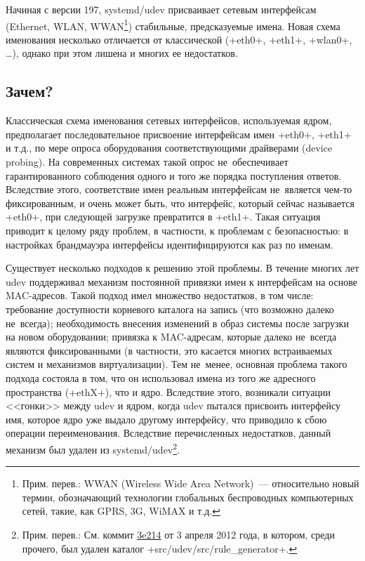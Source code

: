 \documentclass[10pt,oneside,a4paper]{article}
\begin{document}
Начиная с версии 197, systemd/udev присваивает сетевым интерфейсам (Ethernet,
WLAN, WWAN\footnote{Прим. перев.: WWAN (Wireless Wide Area Network)~---
относительно новый термин, обозначающий технологии глобальных беспроводных
компьютерных сетей, такие, как GPRS, 3G, WiMAX и т.д.}) стабильные,
предсказуемые имена. Новая схема именования несколько отличается от классической
(+eth0+, +eth1+, +wlan0+, \ldots{}), однако при этом лишена и многих ее
недостатков.

\subsection{Зачем?}

Классическая схема именования сетевых интерфейсов, используемая ядром,
предполагает последовательное присвоение интерфейсам имен +eth0+, +eth1+ и т.д.,
по мере опроса оборудования соответствующими драйверами (device probing). На
современных системах такой опрос не~обеспечивает гарантированного соблюдения
одного и того же порядка поступления ответов. Вследствие этого, соответствие
имен реальным интерфейсам не~является чем-то фиксированным, и очень может быть,
что интерфейс, который сейчас называется +eth0+, при следующей загрузке
превратится в +eth1+. Такая ситуация приводит к целому ряду проблем, в
частности, к проблемам с безопасностью: в настройках брандмауэра интерфейсы
идентифицируются как раз по именам.

Существует несколько подходов к решению этой проблемы. В течение многих лет udev
поддерживал механизм постоянной привязки имен к интерфейсам на основе
MAC-адресов. Такой подход имел множество недостатков, в том числе: требование
доступности корневого каталога на запись (что возможно далеко не~всегда);
необходимость внесения изменений в образ системы после загрузки на новом
оборудовании; привязка к MAC-адресам, которые далеко не~всегда являются
фиксированными (в частности, это касается многих встраиваемых систем и
механизмов виртуализации). Тем не~менее, основная проблема такого подхода
состояла в том, что он использовал имена из того же адресного пространства
(+ethX+), что и ядро. Вследствие этого, возникали ситуации <<гонки>> между udev
и ядром, когда udev пытался присвоить интерфейсу имя, которое ядро уже выдало
другому интерфейсу, что приводило к сбою операции переименования. Вследствие
перечисленных недостатков, данный механизм был удален из 
systemd/udev\footnote{Прим. перев.: См. коммит
\href{http://cgit.freedesktop.org/systemd/systemd/commit/?id=3e2147858f21943d5f4a781c60f33ac22c6096ed}%
{3e214} от 3 апреля 2012 года, в котором, среди прочего, был удален каталог
+src/udev/src/rule_generator+.}.
\end{document}
